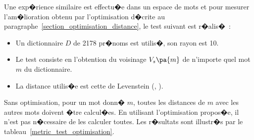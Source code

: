 Une exp�rience similaire est effectu�e dans un espace de mots et pour mesurer l'am�lioration obtenu par l'optimisation d�crite au paragraphe~\ref{section_optimisation_distance}, le test suivant est r�alis�~:

        \begin{itemize}
    \item Un dictionnaire $D$ de 2178 pr�noms est utilis�, son rayon est 10.
    \item Le test consiste en l'obtention du voisinage $V_s\pa{m}$ de n'importe quel mot $m$ du dictionnaire.
    \item La distance utilis�e est cette de Levenstein (, 
            ).
        \end{itemize}

Sans optimisation, pour un mot donn� $m$, toutes les distances de $m$ avec les autres mots doivent �tre calcul�es. En utilisant l'optimisation propos�e, il n'est pas n�cessaire de les calculer toutes. Les r�sultats sont illustr�s par le tableau~\ref{metric_test_optimisation}.

